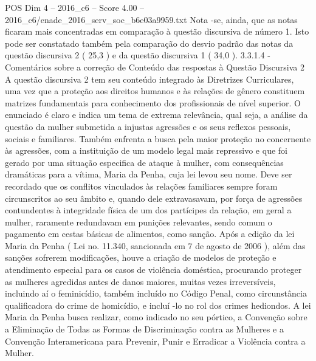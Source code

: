 \begin{textsample}{POS Dim 4 – 2016\_c6 – Score 4.00 – 2016\_c6/enade\_2016\_serv\_soc\_b6e03a9959.txt}
Nota -se, ainda, que as notas ficaram mais concentradas em comparação à questão discursiva de número 1.
Isto pode ser constatado também pela comparação do desvio padrão das notas da questão discursiva 2 ( 25,3 ) e da questão discursiva 1 ( 34,0 ). 3.3.1.4 - Comentários sobre a correção de Conteúdo das respostas à Questão Discursiva 2 A questão discursiva 2 tem seu conteúdo integrado às Diretrizes Curriculares, uma vez que a proteção aos direitos humanos e às relações de gênero constituem matrizes fundamentais para conhecimento dos profissionais de nível superior.
O enunciado é claro e indica um tema de extrema relevância, qual seja, a análise da questão da mulher submetida a injustas agressões e os seus reflexos pessoais, sociais e familiares.
Também enfrenta a busca pela maior proteção no concernente às agressões, com a instituição de um modelo legal mais repressivo e que foi gerado por uma situação especifica de ataque à mulher, com consequências dramáticas para a vítima, Maria da Penha, cuja lei levou seu nome.
Deve ser recordado que os conflitos vinculados às relações familiares sempre foram circunscritos ao seu âmbito e, quando dele extravasavam, por força de agressões contundentes à integridade física de um dos partícipes da relação, em geral a mulher, raramente redundavam em punições relevantes, sendo comum o pagamento em cestas básicas de alimentos, como sanção.
Após a edição da lei Maria da Penha ( Lei no. 11.340, sancionada em 7 de agosto de 2006 ), além das sanções sofrerem modificações, houve a criação de modelos de proteção e atendimento especial para os casos de violência doméstica, procurando proteger as mulheres agredidas antes de danos maiores, muitas vezes irreversíveis, incluindo aí o feminicídio, também incluído no Código Penal, como circunstância qualificadora do crime de homicídio, e incluí -lo no rol dos crimes hediondos.
A lei Maria da Penha busca realizar, como indicado no seu pórtico, a Convenção sobre a Eliminação de Todas as Formas de Discriminação contra as Mulheres e a Convenção Interamericana para Prevenir, Punir e Erradicar a Violência contra a Mulher.

\end{textsample}
